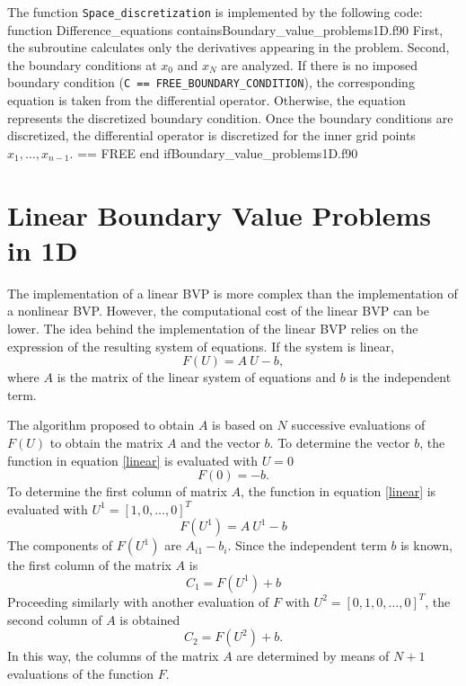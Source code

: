 \newpage 
The function  \verb|Space_discretization| is implemented by the following code: 
 \vspace{0.2cm} 
{function Difference_equations}
{contains}{Boundary_value_problems1D.f90}
First, the subroutine calculates only the derivatives appearing in the problem. Second, the boundary conditions at $ x_0 $ and 
$x_N $ are analyzed. If there is no imposed boundary condition (\verb|C == FREE_BOUNDARY_CONDITION|), the corresponding equation is taken 
from  the differential operator. Otherwise, the equation represents the discretized boundary condition. 
Once the boundary conditions are discretized, 
the differential operator is discretized for the inner grid  
points $ x_1, \ldots, x_{n-1}. $
\vspace{0.2cm} 
{== FREE}
{end if}{Boundary_value_problems1D.f90}

 
 \newpage        
 \section{Linear Boundary Value Problems in 1D}
 The implementation of a linear BVP is more complex than the implementation of a nonlinear BVP. However, the  computational cost of the
 linear BVP can be lower. 
 The idea behind the implementation of the linear BVP relies on the expression of the resulting system of equations. If the system is linear, 
 \begin{equation} 
        F(U) = A \ U - b, 
        \label{linear} 
 \end{equation} 
 where $ A $ is the matrix of the linear system of equations and $ b $ is the independent term. 
 
 
 The algorithm proposed to obtain  $ A $ is based on $ N$ successive evaluations of $ F(U) $ to obtain the matrix $ A $ and the vector $b $.
 To determine the vector $ b $, the function in equation \ref{linear} is evaluated with $ U= 0$  
 $$
   F(0) = - b.
 $$  
 To determine the first column of matrix $ A $, the function in equation \ref{linear} is evaluated with $ U^1 = [1, 0, \ldots, 0]^T $
 $$
    F(U^1) = A \ U^1 - b 
 $$  
 The components of $ F(U^1) $ are $ A_{i1} - b_i$. Since the independent term $ b $ is known, the first column of the matrix $ A $ is 
 $$
  C_1 = F(U^1) + b  
 $$
  Proceeding similarly with another evaluation of $ F $ with $ U^2 = [0, 1, 0, \ldots, 0]^T $, the second column of $ A $ is obtained
  $$
   C_2 = F(U^2) + b.  
  $$ 
 In this way, the columns of the matrix $ A $ are determined by means of  $ N+1$ evaluations of the  function $F $. 
 
